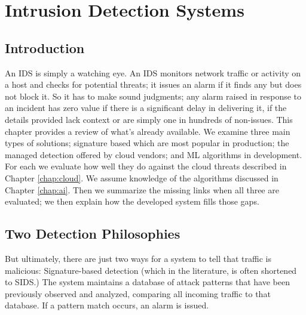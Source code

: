 
\chapter{Intrusion Detection Systems}
\label{chap:ids}

\section{Introduction}
\label{sec:ids_intro}

An IDS is simply a watching eye. An IDS monitors network traffic or activity on a host and checks for potential threats; it issues an alarm if it finds any but does not block it. So it has to make sound judgments; any alarm raised in response to an incident has zero value if there is a significant delay in delivering it, if the details provided lack context or are simply one in hundreds of non-issues. 
This chapter provides a review of what’s already available. 
We examine three main types of solutions; signature based which are most popular in production; the managed detection offered by cloud vendors; and ML algorithms in development. For each we evaluate how well they do against the cloud threats described in Chapter \ref{chap:cloud}. We assume knowledge of the algorithms discussed in Chapter \ref{chap:ai}. Then we summarize the missing links when all three are evaluated; we then explain how the developed system fills those gaps.

\section{Two Detection Philosophies}
\label{sec:ids_philosophies}

But ultimately, there are just two ways for a system to tell that traffic is malicious: Signature-based detection (which in the literature, is often shortened to SIDS.) The system maintains a database of attack patterns that have been previously observed and analyzed, comparing all incoming traffic to that database. If a pattern match occurs, an alarm is issued. 

